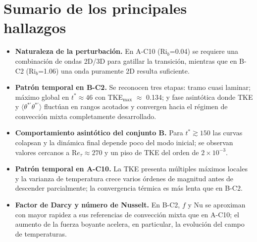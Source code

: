 \section{Sumario de los principales hallazgos}
\begin{itemize}

\item \textbf{Naturaleza de la perturbación.} En A-C10 (Ri$_b$=0.04) se requiere una combinación de ondas 2D/3D para gatillar la transición, mientras que en B-C2 (Ri$_b$=1.06) una onda puramente 2D resulta suficiente.

\item \textbf{Patrón temporal en B-C2.} Se reconocen tres etapas: tramo cuasi laminar; máximo global en $t^*\approx 46$ con TKE$_{\max}$ $\approx$ 0.134; y fase asintótica donde TKE y $\langle\theta^{*\prime}\theta^{*\prime}\rangle$ fluctúan en rangos acotados y convergen hacia el régimen de convección mixta completamente desarrollado.

\item \textbf{Comportamiento asintótico del conjunto B.} Para $t^*\gtrsim 150$ las curvas colapsan y la dinámica final depende poco del modo inicial; se observan valores cercanos a R$e_{\tau}\approx 270$ y un piso de TKE del orden de $2\times 10^{-3}$.

\item \textbf{Patrón temporal en A-C10.} La TKE presenta múltiples máximos locales y la varianza de temperatura crece varios órdenes de magnitud antes de descender parcialmente; la convergencia térmica es más lenta que en B-C2.

\item \textbf{Factor de Darcy y número de Nusselt.} En B-C2, $f$ y Nu se aproximan con mayor rapidez a sus referencias de convección mixta que en A-C10; el aumento de la fuerza boyante acelera, en particular, la evolución del campo de temperaturas.

\end{itemize}